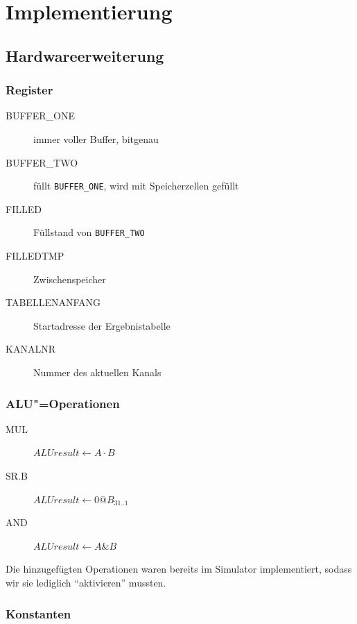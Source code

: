 \chapter{Implementierung}
\label{chapter:Dokumentation-Implementierung}

\section{Hardwareerweiterung}
\label{section:Dokumentation-Implementierung-Hardwareerweiterung}

\subsection{Register}
\label{subsection:Dokumentation-Implementierung-Hardwareerweiterung-Register}

\begin{description}
    \item[BUFFER\_ONE] immer voller Buffer, bitgenau
    \item[BUFFER\_TWO] füllt \texttt{BUFFER\_ONE}, wird mit Speicherzellen gefüllt
    \item[FILLED] Füllstand von \texttt{BUFFER\_TWO}
    \item[FILLEDTMP] Zwischenspeicher
    \item[TABELLENANFANG] Startadresse der Ergebnistabelle
    \item[KANALNR] Nummer des aktuellen Kanals
\end{description}

\subsection{ALU"=Operationen}
\label{subsection:Dokumentation-Implementierung-Hardwareerweiterung-AluOps}

\begin{description}
    \item[MUL] $ALUresult \gets A \cdot B$
    \item[SR.B] $ALUresult \gets 0@B_{31..1}$
    \item[AND] $ALUresult \gets A \& B$
\end{description}

Die hinzugefügten Operationen waren bereits im Simulator implementiert, sodass wir sie lediglich "`aktivieren"' mussten.

\subsection{Konstanten}
\label{subsection:Dokumentation-Implementierung-Hardwareerweiterung-Konstanten}

